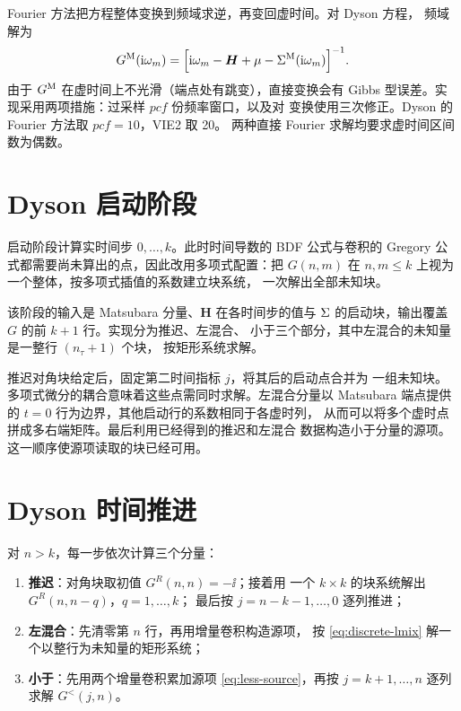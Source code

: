 Fourier 方法把方程整体变换到频域求逆，再变回虚时间。对 Dyson 方程，
频域解为
\begin{equation}
    G^{\mathrm{M}}(\mathrm{i}\omega_m) =
    \Big[\mathrm{i}\omega_m - \bm{H} + \mu
      - \Sigma^{\mathrm{M}}(\mathrm{i}\omega_m)\Big]^{-1}.
\end{equation}
由于 $G^{\mathrm{M}}$ 在虚时间上不光滑（端点处有跳变），直接变换会有
Gibbs 型误差。实现采用两项措施：过采样 $pcf$ 份频率窗口，以及对
变换使用三次修正。Dyson 的 Fourier 方法取 $pcf=10$，VIE2 取 20。
两种直接 Fourier 求解均要求虚时间区间数为偶数。

\section{Dyson 启动阶段}
\label{sec:dyson-start}

启动阶段计算实时间步 $0,\ldots,k$。此时时间导数的 BDF 公式与卷积的
Gregory 公式都需要尚未算出的点，因此改用多项式配置：把 $G(n,m)$
在 $n,m\le k$ 上视为一个整体，按多项式插值的系数建立块系统，
一次解出全部未知块。

该阶段的输入是 Matsubara 分量、$\bm{H}$ 在各时间步的值与
$\Sigma$ 的启动块，输出覆盖 $G$ 的前 $k+1$ 行。实现分为推迟、左混合、
小于三个部分，其中左混合的未知量是一整行 $(n_\tau+1)$ 个块，
按矩形系统求解。

推迟对角块给定后，固定第二时间指标 $j$，将其后的启动点合并为
一组未知块。多项式微分的耦合意味着这些点需同时求解。左混合分量以
Matsubara 端点提供的 $t=0$ 行为边界，其他启动行的系数相同于各虚时列，
从而可以将多个虚时点拼成多右端矩阵。最后利用已经得到的推迟和左混合
数据构造小于分量的源项。这一顺序使源项读取的块已经可用。

\section{Dyson 时间推进}
\label{sec:dyson-step}

对 $n>k$，每一步依次计算三个分量：
\begin{enumerate}[label=(\arabic*)]
    \item \textbf{推迟}：对角块取初值 $G^{R}(n,n)=-\ii$；接着用
          一个 $k\times k$ 的块系统解出 $G^{R}(n,n-q)$，$q=1,\dots,k$；
          最后按 $j=n-k-1,\dots,0$ 逐列推进；
    \item \textbf{左混合}：先清零第 $n$ 行，再用增量卷积构造源项，
          按 \cref{eq:discrete-lmix} 解一个以整行为未知量的矩形系统；
    \item \textbf{小于}：先用两个增量卷积累加源项
          \cref{eq:less-source}，再按 $j=k+1,\dots,n$ 逐列求解
          $G^{<}(j,n)$。
\end{enumerate}

